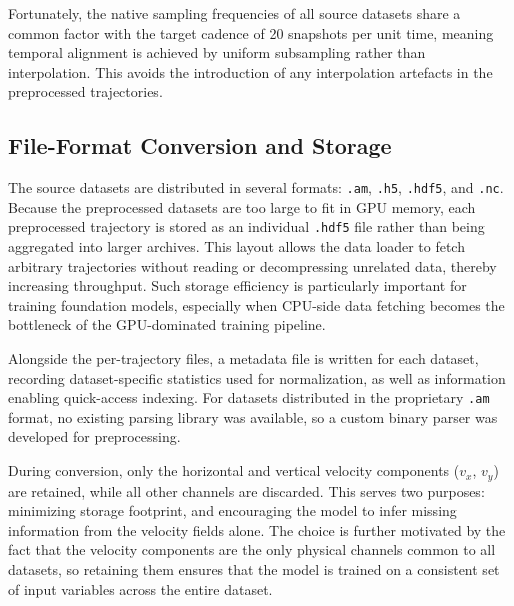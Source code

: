Fortunately, the native sampling frequencies of all source datasets share a common factor
with the target cadence of 20 snapshots per unit time, meaning temporal alignment is achieved
by uniform subsampling rather than interpolation. This avoids the introduction of any
interpolation artefacts in the preprocessed trajectories.
 
\subsection{File-Format Conversion and Storage}
\label{ss:fileformat}

The source datasets are distributed in several formats: \texttt{.am}, \texttt{.h5}, \texttt{.hdf5}, and \texttt{.nc}. Because the preprocessed datasets are too large to fit in GPU memory, each preprocessed trajectory is stored as an individual \texttt{.hdf5} file rather than being aggregated into larger archives. This layout allows the data loader to fetch arbitrary trajectories without reading or decompressing unrelated data, thereby increasing throughput. Such storage efficiency is particularly important for training foundation models, especially when CPU-side data fetching becomes the bottleneck of the GPU-dominated training pipeline.

Alongside the per-trajectory files, a metadata file is written for each dataset, recording dataset-specific statistics used for normalization, as well as information enabling quick-access indexing. For datasets distributed in the proprietary \texttt{.am} format, no existing parsing library was available, so a custom binary parser was developed for preprocessing.

During conversion, only the horizontal and vertical velocity components ($v_x$, $v_y$) are retained, while all other channels are discarded. This serves two purposes: minimizing storage footprint, and encouraging the model to infer missing information from the velocity fields alone. The choice is further motivated by the fact that the velocity components are the only physical channels common to all datasets, so retaining them ensures that the model is trained on a consistent set of input variables across the entire dataset.



 
